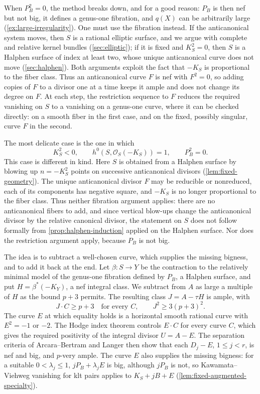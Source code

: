 \documentclass[11pt,reqno]{amsart}
\numberwithin{equation}{section}
\theoremstyle{remark}
\newcommand{\sshf}[1]{\mathcal{O}_{#1}}
\begin{document}
When \(P_B^2=0\), the method breaks down, and for a good reason: \(P_B\) is then nef but not big, it defines a genus-one fibration, and \(q(X)\) can be arbitrarily large (\cref{ex:large-irregularity}). One must use the fibration instead. If the anticanonical system moves, then \(S\) is a rational elliptic surface, and we argue with complete and relative kernel bundles (\cref{sec:elliptic}); if it is fixed and \(K_S^2=0\), then \(S\) is a Halphen surface of index at least two, whose unique anticanonical curve does not move (\cref{sec:halphen}). Both arguments exploit the fact that \(-K_S\) is proportional to the fiber class. Thus an anticanonical curve \(F\) is nef with \(F^2=0\), so adding copies of \(F\) to a divisor one at a time keeps it ample and does not change its degree on \(F\). At each step, the restriction sequence to \(F\) reduces the required vanishing on \(S\) to a vanishing on a genus-one curve, where it can be checked directly: on a smooth fiber in the first case, and on the fixed, possibly singular, curve \(F\) in the second.

The most delicate case is the one in which
\[
 K_S^2<0,\qquad h^0(S,\sshf{S}(-K_S))=1,\qquad P_B^2=0.
\]
This case is different in kind. Here \(S\) is obtained from a Halphen surface by blowing up \(n=-K_S^2\) points on successive anticanonical divisors (\cref{lem:fixed-geometry}). The unique anticanonical divisor \(F\) may be reducible or nonreduced, each of its components has negative square, and \(-K_S\) is no longer proportional to the fiber class. Thus neither fibration argument applies: there are no anticanonical fibers to add, and since vertical blow-ups change the anticanonical divisor by the relative canonical divisor, the statement on \(S\) does not follow formally from \cref{prop:halphen-induction} applied on the Halphen surface. Nor does the restriction argument apply, because \(P_B\) is not big.

The idea is to subtract a well-chosen curve, which supplies the missing bigness, and to add it back at the end. Let \(\beta\colon S\to Y\) be the contraction to the relatively minimal model of the genus-one fibration defined by \(P_B\), a Halphen surface, and put \(H=\beta^*(-K_Y)\), a nef integral class. We subtract from \(A\) as large a multiple of \(H\) as the bound \(p+3\) permits. The resulting
class \(J=A-\tau H\) is ample, with
\[
 J\cdot C\geq p+3\quad\text{for every }C,\qquad J^2\geq3(p+3)^2.
\]
The curve \(E\) at which equality holds is a horizontal smooth rational curve with \(E^2=-1\) or \(-2\). The Hodge index theorem controls \(E\cdot C\) for every curve \(C\), which gives the required positivity of the integral divisor \(U=A-E\).    The separation criteria of Arcara--Bertram and Langer then show that each \(D_j-E\), \(1\leq j<r\), is nef and big, and \(p\)-very ample. The curve \(E\) also supplies the missing bigness: for a suitable \(0<\lambda_j\leq1\), \(jP_B+\lambda_jE\) is big, although \(jP_B\) is not, so Kawamata--Viehweg vanishing for klt pairs applies to \(K_S+jB+E\) (\cref{lem:fixed-augmented-specialty}).
\end{document}
